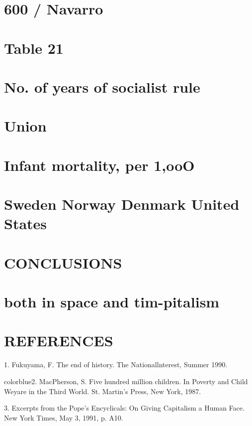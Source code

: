 


\section{600 / Navarro}


\section{Table 21}


\section{No. of years of socialist rule}


\section{Union}


\section{Infant mortality, per 1,ooO}


\section{Sweden Norway Denmark United States}


\section{CONCLUSIONS}


\section{both in space and tim-pitalism}


\section{REFERENCES}


	{\color{blue}1}. Fukuyama, F. The end of history. The Nationallnterest, Summer 1990.


	{color{blue}2}. MacPherson, S. Five hundred million children. In Poverty and Child Weyare in the Third World. St. Martin’s Press, New York, 1987.


	{\color{blue}3}. Excerpts from the Pope’s Encyclicals: On Giving Capitalism a Human Face. New York Times, May 3, 1991, p. A10.


